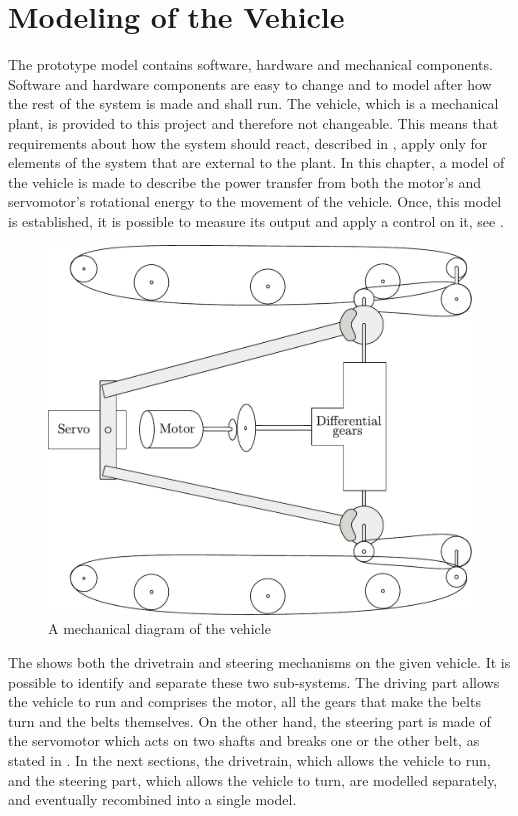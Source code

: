 \chapter{Modeling of the Vehicle}\label{cha:ModelOfVehicle}

The prototype model contains software, hardware and mechanical components. Software and hardware components are easy to change and to model after how the rest of the system is made and shall run. The vehicle, which is a mechanical plant, is provided to this project and therefore not changeable. This means that requirements about how the system should react, described in , apply only for elements of the system that are external to the plant. In this chapter, a model of the vehicle is made to describe the power transfer from both the motor's and servomotor's rotational energy to the movement of the vehicle. Once, this model is established, it is possible to measure its output and apply a control on it, see .


\begin{figure}[H]
	\centering
	\includegraphics[width=\textwidth]{figures/completeMechanical.pdf}
	\caption{A mechanical diagram of the vehicle}
	\label{fig:completeMechanicalDiagram}
\end{figure}

The  shows both the drivetrain and steering mechanisms on the given vehicle. It is possible to identify and separate these two sub-systems. The driving part allows the vehicle to run and comprises the motor, all the gears that make the belts turn and the belts themselves. On the other hand, the steering part is made of the servomotor which acts on two shafts and breaks one or the other belt, as stated in . In the next sections, the drivetrain, which allows the vehicle to run, and the steering part, which allows the vehicle to turn, are modelled separately, and eventually recombined into a single model.
